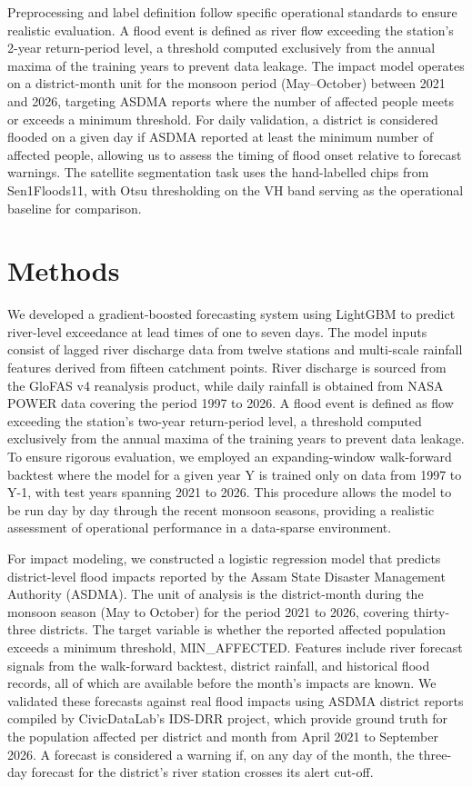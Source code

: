 \documentclass[conference]{IEEEtran}
\begin{document}
Preprocessing and label definition follow specific operational standards to ensure realistic evaluation. A flood event is defined as river flow exceeding the station's 2-year return-period level, a threshold computed exclusively from the annual maxima of the training years to prevent data leakage. The impact model operates on a district-month unit for the monsoon period (May–October) between 2021 and 2026, targeting ASDMA reports where the number of affected people meets or exceeds a minimum threshold. For daily validation, a district is considered flooded on a given day if ASDMA reported at least the minimum number of affected people, allowing us to assess the timing of flood onset relative to forecast warnings. The satellite segmentation task uses the hand-labelled chips from Sen1Floods11, with Otsu thresholding on the VH band serving as the operational baseline for comparison.

\section{Methods}
We developed a gradient-boosted forecasting system using LightGBM to predict river-level exceedance at lead times of one to seven days. The model inputs consist of lagged river discharge data from twelve stations and multi-scale rainfall features derived from fifteen catchment points. River discharge is sourced from the GloFAS v4 reanalysis product, while daily rainfall is obtained from NASA POWER data covering the period 1997 to 2026. A flood event is defined as flow exceeding the station's two-year return-period level, a threshold computed exclusively from the annual maxima of the training years to prevent data leakage. To ensure rigorous evaluation, we employed an expanding-window walk-forward backtest where the model for a given year Y is trained only on data from 1997 to Y-1, with test years spanning 2021 to 2026. This procedure allows the model to be run day by day through the recent monsoon seasons, providing a realistic assessment of operational performance in a data-sparse environment.

For impact modeling, we constructed a logistic regression model that predicts district-level flood impacts reported by the Assam State Disaster Management Authority (ASDMA). The unit of analysis is the district-month during the monsoon season (May to October) for the period 2021 to 2026, covering thirty-three districts. The target variable is whether the reported affected population exceeds a minimum threshold, MIN\_AFFECTED. Features include river forecast signals from the walk-forward backtest, district rainfall, and historical flood records, all of which are available before the month's impacts are known. We validated these forecasts against real flood impacts using ASDMA district reports compiled by CivicDataLab's IDS-DRR project, which provide ground truth for the population affected per district and month from April 2021 to September 2026. A forecast is considered a warning if, on any day of the month, the three-day forecast for the district's river station crosses its alert cut-off.
\end{document}
